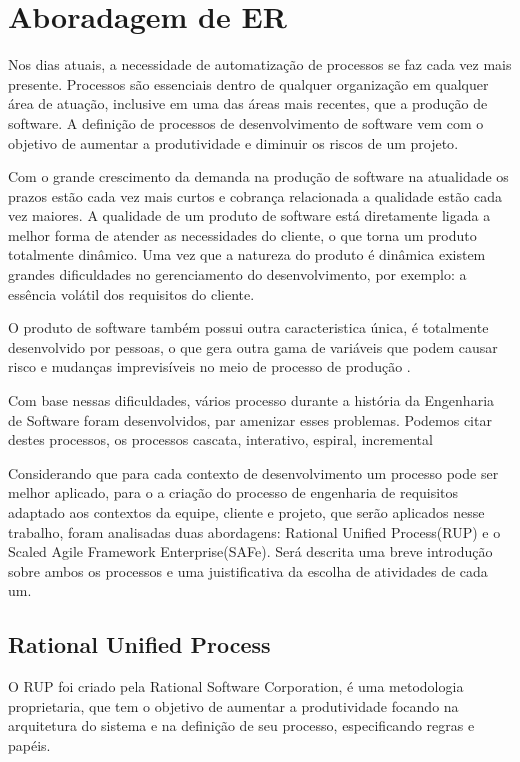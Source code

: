 \chapter[Aboradagem de ER]{Aboradagem de ER}\label{cap3}

Nos dias atuais, a necessidade de automatização de processos se faz cada vez mais
presente. Processos são essenciais dentro de qualquer organização em qualquer área
de atuação, inclusive em uma das áreas mais recentes, que a produção de software.
A definição de processos de desenvolvimento de software vem com o objetivo de aumentar
a produtividade e diminuir os riscos de um projeto\cite{VIEIRA}.

Com o grande crescimento da demanda na produção de software
na atualidade os prazos estão cada vez mais curtos e cobrança relacionada a qualidade
estão cada vez maiores. A qualidade de um produto de software está diretamente ligada
a melhor forma de atender as necessidades do cliente, o que torna um produto totalmente dinâmico.
Uma vez que a natureza do produto é dinâmica existem grandes dificuldades no gerenciamento
do desenvolvimento, por exemplo: a essência volátil dos requisitos do cliente\cite{TAVARES}.

O produto de software também possui outra caracteristica única, é totalmente desenvolvido
por pessoas, o que gera outra gama de variáveis que podem causar risco e mudanças
imprevisíveis no meio de processo de produção \cite{SCHWABER}.

Com base nessas dificuldades, vários processo durante a história da Engenharia de
Software foram desenvolvidos, par amenizar esses problemas. Podemos citar destes
processos, os processos cascata, interativo, espiral, incremental

Considerando que para cada contexto de desenvolvimento um processo pode ser melhor
aplicado, para o a criação do processo de engenharia de requisitos adaptado aos
contextos da equipe, cliente e projeto, que serão aplicados nesse trabalho, foram
analisadas duas abordagens: Rational Unified Process(RUP) e o Scaled Agile Framework
Enterprise(SAFe). Será descrita uma breve introdução sobre ambos os processos e uma
juistificativa da escolha de atividades de cada um.

\section{Rational Unified Process}

O RUP foi criado pela Rational Software Corporation, é uma metodologia proprietaria,
que tem o objetivo de aumentar a produtividade focando na arquitetura do sistema
e na definição de seu processo, especificando regras e papéis\cite{IBM}.

